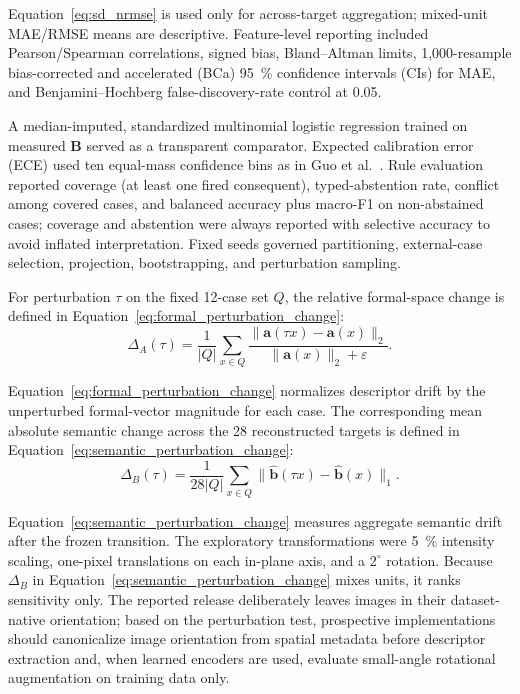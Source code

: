 \documentclass{ceurart}
\newcommand{\matB}{\mathbf{B}}
\begin{document}
Equation~\eqref{eq:sd_nrmse} is used only for across-target aggregation; mixed-unit MAE/RMSE means are descriptive. Feature-level reporting included Pearson/Spearman correlations, signed bias, Bland--Altman limits, 1,000-resample bias-corrected and accelerated (BCa) 95~\% confidence intervals (CIs) for MAE, and Benjamini--Hochberg false-discovery-rate control at 0.05.

A median-imputed, standardized multinomial logistic regression trained on measured \(\matB\) served as a transparent comparator. Expected calibration error (ECE) used ten equal-mass confidence bins as in Guo et al.~\cite{Guo2017Calibration}. Rule evaluation reported coverage (at least one fired consequent), typed-abstention rate, conflict among covered cases, and balanced accuracy plus macro-F1 on non-abstained cases; coverage and abstention were always reported with selective accuracy to avoid inflated interpretation. Fixed seeds governed partitioning, external-case selection, projection, bootstrapping, and perturbation sampling.

For perturbation \(\tau\) on the fixed 12-case set \(Q\), the relative formal-space change is defined in Equation~\eqref{eq:formal_perturbation_change}:
\begin{equation}
\Delta_A(\tau)=\frac{1}{|Q|}\sum_{x\in Q}\frac{\|\mathbf a(\tau x)-\mathbf a(x)\|_2}{\|\mathbf a(x)\|_2+\varepsilon}.
\label{eq:formal_perturbation_change}
\end{equation}

Equation~\eqref{eq:formal_perturbation_change} normalizes descriptor drift by the unperturbed formal-vector magnitude for each case. The corresponding mean absolute semantic change across the 28 reconstructed targets is defined in Equation~\eqref{eq:semantic_perturbation_change}:
\begin{equation}
\Delta_B(\tau)=\frac{1}{28|Q|}\sum_{x\in Q}\|\widehat{\mathbf b}(\tau x)-\widehat{\mathbf b}(x)\|_1 .
\label{eq:semantic_perturbation_change}
\end{equation}

Equation~\eqref{eq:semantic_perturbation_change} measures aggregate semantic drift after the frozen transition. The exploratory transformations were 5~\% intensity scaling, one-pixel translations on each in-plane axis, and a \(2^\circ\) rotation. Because \(\Delta_B\) in Equation~\eqref{eq:semantic_perturbation_change} mixes units, it ranks sensitivity only. The reported release deliberately leaves images in their dataset-native orientation; based on the perturbation test, prospective implementations should canonicalize image orientation from spatial metadata before descriptor extraction and, when learned encoders are used, evaluate small-angle rotational augmentation on training data only.
\end{document}
